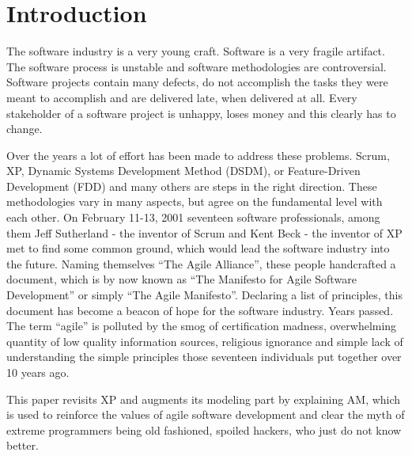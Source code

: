 \section{Introduction}
The software industry is a very young craft. Software is a very
fragile artifact. The software process is unstable and software methodologies
are controversial. Software projects contain many defects, do not accomplish
the tasks they were meant to accomplish and are delivered late, when delivered at
all. Every stakeholder of a software project is unhappy, loses money and this
clearly has to change.

Over the years a lot of effort has been made to address these problems. Scrum,
XP, Dynamic Systems Development Method (DSDM), or Feature-Driven Development
(FDD) and many others are steps in the right direction. These methodologies vary
in many aspects, but agree on the fundamental level with each other. On
February 11-13, 2001 seventeen software professionals, among them Jeff
Sutherland - the inventor of Scrum and Kent Beck - the inventor of XP met to
find some common ground, which would lead the software industry into the future.
Naming themselves \enquote{The Agile Alliance}, these people handcrafted a
document, which is by now known as \enquote{The Manifesto for Agile Software
Development} or simply \enquote{The Agile Manifesto}. Declaring a list of
principles, this document has become a beacon of hope for the software industry.
Years passed. The term \enquote{agile} is polluted by the smog of certification
madness, overwhelming quantity of low quality information sources, religious
ignorance and simple lack of understanding the simple principles those seventeen
individuals put together over 10 years ago.

This paper revisits XP and augments its modeling part by explaining AM, which
is used to reinforce the values of agile software development and clear the myth
of extreme programmers being old fashioned, spoiled hackers, who just do not
know better.

